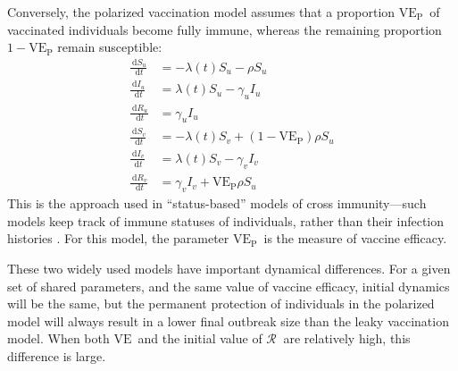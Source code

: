 \documentclass[12pt]{article}
\newcommand{\Rx}[1]{\ensuremath{{\mathcal R}_{#1}}\xspace}
\newcommand{\dd}[1]{\ensuremath{\, \mathrm{d}#1}}
\newcommand{\VE}{\ensuremath{\mathrm{VE}}}
\newcommand{\VEP}{\ensuremath{\VE_{\mathrm{P}}}}
\begin{document}
Conversely, the polarized vaccination model assumes that a proportion \VEP\ of vaccinated individuals become fully immune, whereas the remaining proportion $1-\VEP$ remain susceptible: 
\begin{align}
\frac{\dd S_u}{\dd t} &= - \lambda(t) S_u - \rho S_u \\
\frac{\dd I_u}{\dd t} &= \lambda(t) S_u - \gamma_u I_u \\
\frac{\dd R_u}{\dd t} &= \gamma_u I_u \\
\frac{\dd S_v}{\dd t} &= - \lambda(t) S_v + (1-\VEP) \rho S_u \\
\frac{\dd I_v}{\dd t} &= \lambda(t) S_v - \gamma_v I_v \\
\frac{\dd R_v}{\dd t} &= \gamma_v I_v + \VEP \rho S_u
\end{align}
This is the approach used in “status-based” models of cross immunity---such models keep track of immune statuses of individuals, rather than their infection histories \citep{gog2002dynamics,gog2002status,kucharski2016capturing}.
For this model, the parameter \VEP\ is the measure of vaccine efficacy.

These two widely used models have important dynamical differences. For a given set of shared parameters, and the same value of vaccine efficacy, initial dynamics will be the same, but the permanent protection of individuals in the polarized model will always result in a lower final outbreak size than the leaky vaccination model. When both \VE\ and the initial value of \Rx\ are relatively high, this difference is large.
\end{document}
